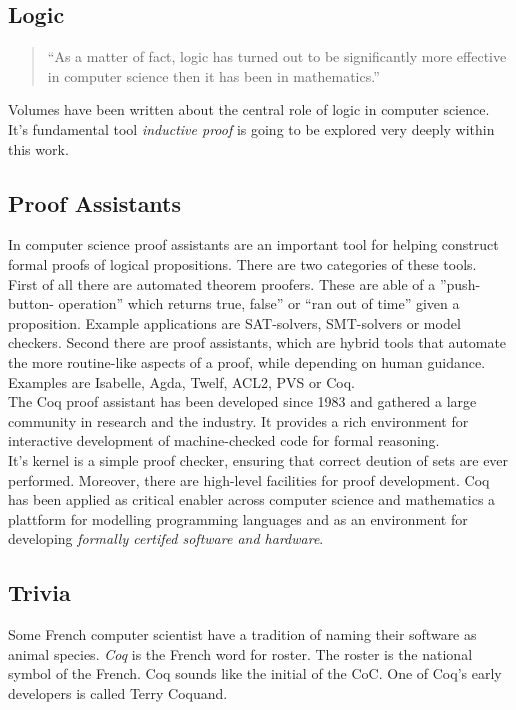 \subsection{Logic}

\begin{quote}
``As a matter of fact, logic has turned out to be significantly more effective in computer science then it has been in mathematics.''
\end{quote}
Volumes have been written about the central role of logic in computer science. 
It's fundamental tool {\itshape inductive proof} is going to be explored very deeply within this work.


\subsection{Proof Assistants}

In computer science proof assistants are an important tool for helping construct formal proofs of logical propositions.
There are two categories of these tools.\\
First of all there are automated theorem proofers. 
These are able of a ''push-button- operation'' which returns true, false'' or ``ran out of time'' given a proposition.
Example applications are \gls{SAT-solvers}, \gls{SMT-solvers} or \glspl{model checker}. 
Second there are proof assistants, which are hybrid tools that automate the more routine-like aspects of a proof, while depending on human guidance. 
Examples are \gls{Isabelle}, Agda, Twelf, ACL2, PVS or Coq.\\
The Coq proof assistant has been developed since 1983 and gathered a large community in research and the industry.
It provides a rich environment for interactive development of machine-checked code for formal reasoning.\\
It's kernel is a simple proof checker, ensuring that correct deution of sets are ever performed. 
Moreover, there are high-level facilities for proof development.
Coq has been applied as critical enabler across computer science and mathematics a plattform for modelling programming languages and as an environment for developing {\itshape formally certifed software and hardware}.
 

\subsection{Trivia}

Some French computer scientist have a tradition of naming their software as animal species.
{\itshape Coq} is the French word for roster.
The roster is the national symbol of the French.
Coq sounds like the initial of the \gls{CoC}.
One of Coq's early developers is called Terry Coquand.


